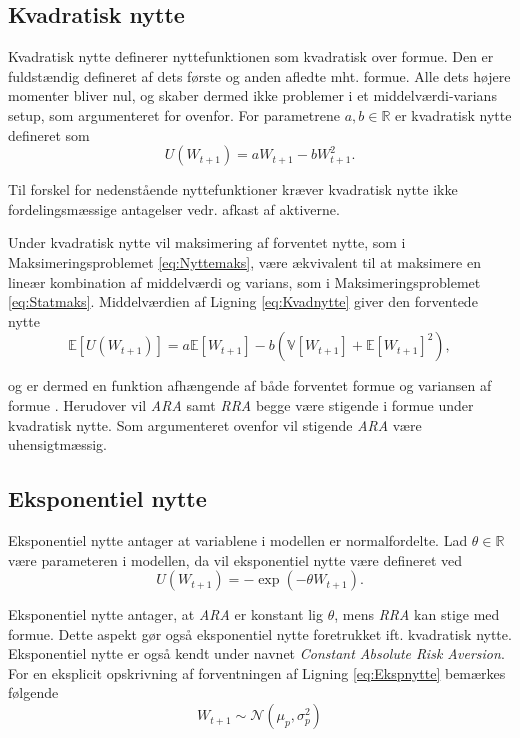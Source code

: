 \documentclass[
  a4paper,
  oneside]{memoir}
\begin{document}
\hypertarget{kvadratisk-nytte}{%
\subsection{Kvadratisk nytte}\label{kvadratisk-nytte}}

Kvadratisk nytte definerer nyttefunktionen som kvadratisk over formue. Den er fuldstændig defineret af dets første og anden afledte mht. formue. Alle dets højere momenter bliver nul, og skaber dermed ikke problemer i et middelværdi-varians setup, som argumenteret for ovenfor. For parametrene \(a,b\in\mathbb{R}\) er kvadratisk nytte defineret som
\begin{equation}
U(W_{t+1})=aW_{t+1}-bW_{t+1}^2. \label{eq:Kvadnytte}
\end{equation}

Til forskel for nedenstående nyttefunktioner kræver kvadratisk nytte ikke fordelingsmæssige antagelser vedr. afkast af aktiverne.

Under kvadratisk nytte vil maksimering af forventet nytte, som i Maksimeringsproblemet \eqref{eq:Nyttemaks}, være ækvivalent til at maksimere en lineær kombination af middelværdi og varians, som i Maksimeringsproblemet \eqref{eq:Statmaks}. Middelværdien af Ligning \eqref{eq:Kvadnytte} giver den forventede nytte
\[\mathbb{E}[U(W_{t+1})]=a\mathbb{E}[W_{t+1}]-b(\mathbb{V}[W_{t+1}]+\mathbb{E}[W_{t+1}]^2),\]

og er dermed en funktion afhængende af både forventet formue og variansen af formue \citep{Munk2017}. Herudover vil \emph{ARA} samt \emph{RRA} begge være stigende i formue under kvadratisk nytte. Som argumenteret ovenfor vil stigende \emph{ARA} være uhensigtmæssig.

\hypertarget{eksponentiel-nytte}{%
\subsection{Eksponentiel nytte}\label{eksponentiel-nytte}}

Eksponentiel nytte antager at variablene i modellen er normalfordelte. Lad \(\theta\in\mathbb{R}\) være parameteren i modellen, da vil eksponentiel nytte være defineret ved
\begin{equation}
U(W_{t+1})=-\exp\left(-\theta W_{t+1}\right). \label{eq:Ekspnytte}
\end{equation}

Eksponentiel nytte antager, at \emph{ARA} er konstant lig \(\theta\), mens \emph{RRA} kan stige med formue. Dette aspekt gør også eksponentiel nytte foretrukket ift. kvadratisk nytte. Eksponentiel nytte er også kendt under navnet \emph{Constant Absolute Risk Aversion}. For en eksplicit opskrivning af forventningen af Ligning \eqref{eq:Ekspnytte} bemærkes følgende
\[W_{t+1}\sim \mathcal{N}\left(\mu_p,\sigma_p^2\right)\]
\end{document}

